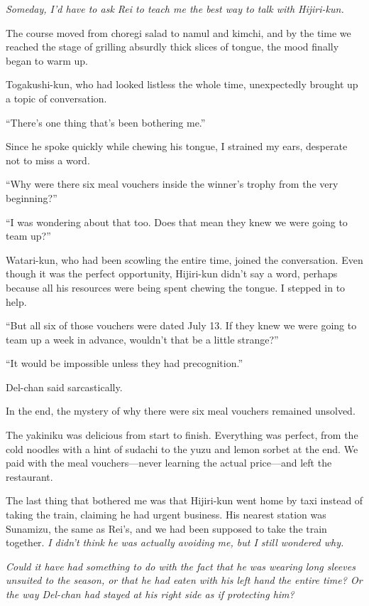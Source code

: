 \documentclass[
    a4paper,
    12pt,
    twoside,
    openany,
    UTF8,
    fontset=windows
]{ctexbook}
\begin{document}
\textit{Someday, I'd have to ask Rei to teach me the best way to talk with Hijiri-kun.}

The course moved from choregi salad to namul and kimchi, and by the time we reached the stage of grilling absurdly thick slices of tongue, the mood finally began to warm up.

Togakushi-kun, who had looked listless the whole time, unexpectedly brought up a topic of conversation.

``There's one thing that's been bothering me.''

Since he spoke quickly while chewing his tongue, I strained my ears, desperate not to miss a word.

``Why were there six meal vouchers inside the winner's trophy from the very beginning?''

``I was wondering about that too. Does that mean they knew we were going to team up?''

Watari-kun, who had been scowling the entire time, joined the conversation. Even though it was the perfect opportunity, Hijiri-kun didn't say a word, perhaps because all his resources were being spent chewing the tongue. I stepped in to help.

``But all six of those vouchers were dated July 13. If they knew we were going to team up a week in advance, wouldn't that be a little strange?''

``It would be impossible unless they had precognition.''

Del-chan said sarcastically.

In the end, the mystery of why there were six meal vouchers remained unsolved.

The yakiniku was delicious from start to finish. Everything was perfect, from the cold noodles with a hint of sudachi to the yuzu and lemon sorbet at the end. We paid with the meal vouchers---never learning the actual price---and left the restaurant.

The last thing that bothered me was that Hijiri-kun went home by taxi instead of taking the train, claiming he had urgent business. His nearest station was Sunamizu, the same as Rei's, and we had been supposed to take the train together. \textit{I didn't think he was actually avoiding me, but I still wondered why.}

\textit{Could it have had something to do with the fact that he was wearing long sleeves unsuited to the season, or that he had eaten with his left hand the entire time? Or the way Del-chan had stayed at his right side as if protecting him?}
\end{document}
